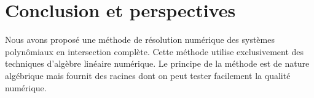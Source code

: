 \documentclass{standalone}
\begin{document}
\section{Conclusion et perspectives}
Nous avons proposé une méthode de résolution numérique des systèmes polynômiaux en intersection complète. Cette méthode utilise exclusivement des techniques d'algèbre linéaire numérique. Le principe de la méthode est de nature algébrique mais fournit des racines dont on peut tester facilement la qualité numérique.
\end{document}
